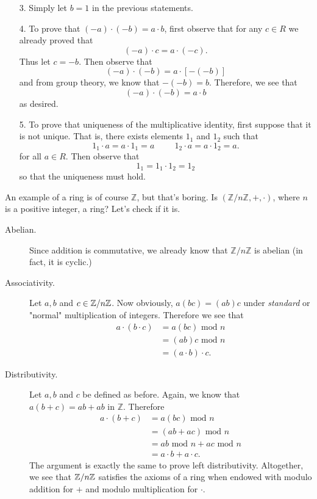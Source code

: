 \begin{prf}
\begin{itemize}
        \item[3.] Simply let $b = 1$ in the previous statements. 
        \item[4.] To prove that $(-a) \cdot (-b) = a \cdot b$,
        first observe that for any $c \in  R$ we already proved
        that 
        \[
            (-a) \cdot c = a \cdot (-c).
        \]
        Thus let $c = -b$. Then observe that 
        \[
            (-a) \cdot (-b) = a \cdot [-(-b)]
        \]
        and from group theory, we know that $-(-b) = b$.
        Therefore, we see that 
        \[
            (-a) \cdot (-b) = a \cdot b
        \]
        as desired. 

        \item[5.] To prove that uniqueness of the multiplicative
        identity, first suppose that it is not unique. That is,
        there exists elements $1_1$ and $1_2$ such that 
        \[
            1_1 \cdot a = a \cdot 1_1 = a \hspace{1cm}   1_2 \cdot a = a \cdot 1_2 = a.
        \]
        for all $a \in R$. Then observe that 
        \[
            1_1 = 1_1 \cdot 1_2 = 1_2
        \]
        so that the uniqueness must hold.
        
            
    \end{itemize}
\end{prf}
\textcolor{NavyBlue}{An example of a ring is of course $\mathbb{Z}$, but that's boring. 
Is $(\mathbb{Z}/n\mathbb{Z}, + , \cdot)$, where $n$ is a positive
integer, a ring? Let's check if it is. }
\begin{description}
    \item[Abelian.] Since addition is commutative, we already know
    that $\mathbb{Z}/n\mathbb{Z}$ is abelian (in fact, it is
    cyclic.)
    
    \item[Associativity.] Let $a, b$ and $c \in \mathbb{Z}/n\mathbb{Z}$. Now
    obviously, $a(bc) = (ab)c$ under \textit{standard} or "normal"
    multiplication of integers. Therefore we see that   
    \begin{align*}
        a\cdot(b \cdot c) &= a(bc) \mbox{ mod } n \\
        & = (ab)c \mbox{ mod }n \\
        & =(a \cdot b ) \cdot c.
    \end{align*}

    \item[Distributivity.] Let $a, b$ and $c$ be defined as before.
    Again, we know that $a(b + c) = ab + ab$ in $\mathbb{Z}$.
    Therefore 
    \begin{align*}
        a\cdot(b + c) &= a(bc) \mbox{ mod } n \\
        & = (ab + ac) \mbox{ mod }n \\
        & = ab \mbox{ mod }n + ac \mbox{ mod }n\\
        & = a \cdot b + a \cdot c.
    \end{align*}
    The argument is exactly the same to prove left distributivity.
    Altogether, we see that $\mathbb{Z}/n\mathbb{Z}$ satisfies the axioms of a
    ring when endowed with modulo addition for $+$ and modulo
    multiplication for $\cdot$. 
\end{description}


